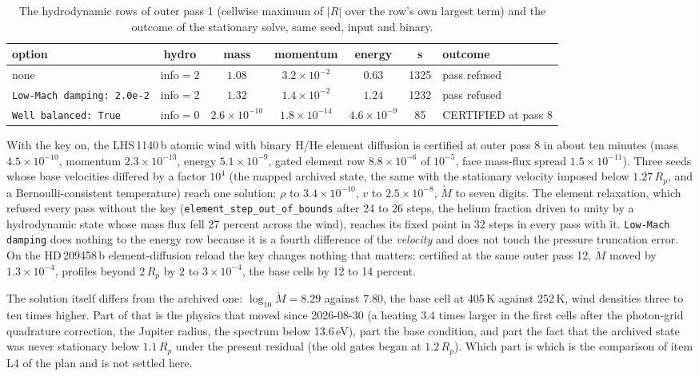 \documentclass[english,a4paper]{my_memo}
\begin{document}
\begin{table}[h]
\centering
\caption{The hydrodynamic rows of outer pass 1 (cellwise maximum of
$|R|$ over the row's own largest term) and the outcome of the stationary
solve, same seed, input and binary.}
\begin{tabular}{lcccccl}
\toprule
option & hydro & mass & momentum & energy & s & outcome \\
\midrule
none & info$=2$ & $1.08$ & $3.2\times10^{-2}$ & $0.63$ & 1325 & pass refused \\
\texttt{Low-Mach damping:\ 2.0e-2} & info$=2$ & $1.32$ & $1.4\times10^{-2}$ & $1.24$ & 1232 & pass refused \\
\texttt{Well balanced:\ True} & info$=0$ & $2.6\times10^{-10}$ & $1.8\times10^{-14}$ & $4.6\times10^{-9}$ & 85 & CERTIFIED at pass 8 \\
\bottomrule
\end{tabular}
\end{table}

With the key on, the LHS\,1140\,b atomic wind with binary H/He element
diffusion is certified at outer pass 8 in about ten minutes (mass
$4.5\times10^{-10}$, momentum $2.3\times10^{-13}$, energy $5.1\times10^{-9}$,
gated element row $8.8\times10^{-6}$ of $10^{-5}$, face mass-flux spread
$1.5\times10^{-11}$). Three seeds whose base velocities differed by a factor
$10^{4}$ (the mapped archived state, the same with the stationary velocity
imposed below $1.27\,R_p$, and a Bernoulli-consistent temperature) reach one
solution: $\rho$ to $3.4\times10^{-10}$, $v$ to $2.5\times10^{-8}$, $\dot M$
to seven digits. The element relaxation, which refused every pass without the
key (\texttt{element\_step\_out\_of\_bounds} after 24 to 26 steps, the helium
fraction driven to unity by a hydrodynamic state whose mass flux fell 27
percent across the wind), reaches its fixed point in 32 steps in every pass
with it. \texttt{Low-Mach damping} does nothing to the energy row because it
is a fourth difference of the \emph{velocity} and does not touch the pressure
truncation error. On the HD\,209458\,b element-diffusion reload the key
changes nothing that matters: certified at the same outer pass 12, $\dot M$
moved by $1.3\times10^{-4}$, profiles beyond $2\,R_p$ by $2$ to
$3\times10^{-4}$, the base cells by 12 to 14 percent.

The solution itself differs from the archived one: $\log_{10}\dot M = 8.29$
against $7.80$, the base cell at 405\,K against 252\,K, wind densities three
to ten times higher. Part of that is the physics that moved since 2026-08-30
(a heating 3.4 times larger in the first cells after the photon-grid
quadrature correction, the Jupiter radius, the spectrum below 13.6\,eV), part
the base condition, and part the fact that the archived state was never
stationary below $1.1\,R_p$ under the present residual (the old gates began
at $1.2\,R_p$). Which part is which is the comparison of item L4 of the plan
and is not settled here.
\end{document}
